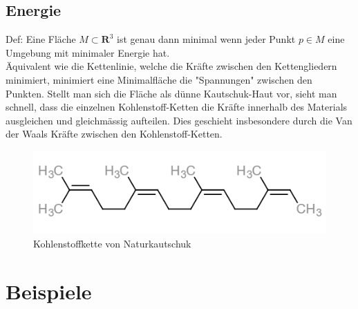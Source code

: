 \begin{refsection}
\subsection{Energie}
Def: Eine Fläche $M \subset \mathbf{R}^{3}$ ist genau dann minimal wenn jeder Punkt $p \in M$ eine Umgebung mit minimaler Energie hat.\\
Äquivalent wie die Kettenlinie, welche die Kräfte zwischen den Kettengliedern minimiert, minimiert eine Minimalfläche die "Spannungen" zwischen den Punkten. Stellt man sich die Fläche als dünne Kautschuk-Haut vor, sieht man schnell, dass die einzelnen Kohlenstoff-Ketten die Kräfte innerhalb des Materials ausgleichen und gleichmässig aufteilen. Dies geschieht insbesondere durch die Van der Waals Kräfte zwischen den Kohlenstoff-Ketten.

\begin{figure}[H]
  \centering
  \includegraphics[scale=0.7]{minimal/cis-Polyisopren.PNG}
  \caption{Kohlenstoffkette von Naturkautschuk} 
\end{figure}


\section{Beispiele}

\end{refsection}
